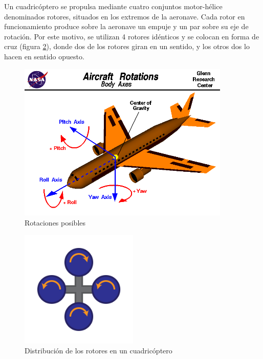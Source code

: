 \documentclass[12pt,twoside]{article}
\begin{document}
		
		Un cuadricóptero se propulsa mediante cuatro conjuntos motor-hélice denominados rotores, situados en los extremos de la aeronave.
		Cada rotor en funcionamiento produce sobre la aeronave un empuje y un par sobre su eje de rotación. 
		Por este motivo, se utilizan 4 rotores idénticos y se colocan en forma de cruz (figura \ref{fig:quadrotorhover}), 
		donde dos de los rotores giran en un sentido, y los otros dos lo hacen en sentido opuesto.
		
		\begin{figure}
			\centering
			\includegraphics[width=0.9\textwidth]{Imatges/Funcionament/rotations.png}
			\caption{Rotaciones posibles}
			\label{fig:rotations}
		\end{figure}
		
		\begin{figure}
			\centering
			\includegraphics[width=0.5\textwidth]{Imatges/Funcionament/quadrotorhover.png}
			\caption{Distribución de los rotores en un cuadricóptero}
			\label{fig:quadrotorhover}
		\end{figure}
		
\end{document}
